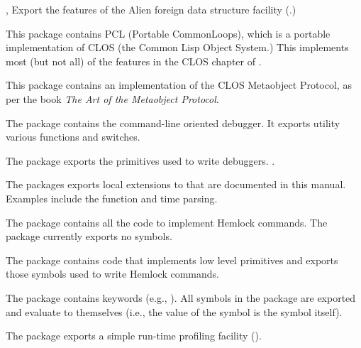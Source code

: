 \begin{Lentry}
\item[\code{alien}, \code{c-call}] Export the features of the Alien
  foreign data structure facility (.)
  
\item[\code{pcl}] This package contains PCL (Portable CommonLoops),
  which is a portable implementation of CLOS (the Common Lisp Object
  System.)  This implements most (but not all) of the features in the
  CLOS chapter of \cltltwo{}.

\item[\code{clos-mop (mop)}] This package contains an implementation
  of the CLOS Metaobject Protocol, as per the book \textit{The Art of
  the Metaobject Protocol}.
  
\item[\code{debug}] The  package contains the command-line
  oriented debugger.  It exports utility various functions and
  switches.
  
\item[\code{debug-internals}] The  package
  exports the primitives used to write debuggers.
  .
  
\item[\code{extensions (ext)}] The  packages exports
  local extensions to \clisp{} that are documented in this manual.
  Examples include the  function and time parsing.
  
\item[\code{hemlock (ed)}] The  package contains all the
  code to implement Hemlock commands.  The  package
  currently exports no symbols.
  
\item[\code{hemlock-internals (hi)}] The 
  package contains code that implements low level primitives and
  exports those symbols used to write Hemlock commands.
  
\item[\code{keyword}] The  package contains keywords
  (e.g., ).  All symbols in the  package are
  exported and evaluate to themselves (i.e., the value of the symbol
  is the symbol itself).
  
\item[\code{profile}] The  package exports a simple
  run-time profiling facility ().
  

\end{Lentry}
